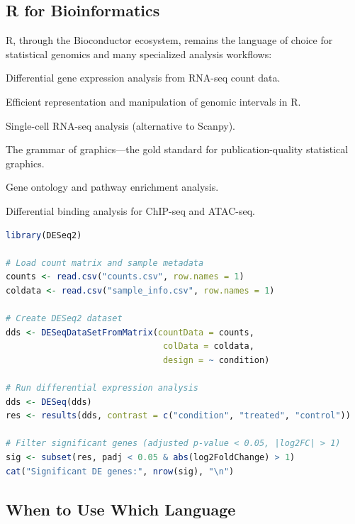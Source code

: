 \subsection{R for Bioinformatics}
\label{subsec:bioinf:r}

R, through the Bioconductor ecosystem, remains the language of choice for statistical genomics and many specialized analysis workflows:

\begin{description}[style=nextline, font=\bfseries, itemsep=3pt]
  \item[DESeq2 / edgeR / limma-voom] Differential gene expression analysis from RNA-seq count data.
  \item[GenomicRanges / GenomicAlignments] Efficient representation and manipulation of genomic intervals in R.
  \item[Seurat] Single-cell RNA-seq analysis (alternative to Scanpy).
  \item[ggplot2] The grammar of graphics---the gold standard for publication-quality statistical graphics.
  \item[clusterProfiler] Gene ontology and pathway enrichment analysis.
  \item[DiffBind] Differential binding analysis for ChIP-seq and ATAC-seq.
\end{description}

\begin{lstlisting}[language=R,caption={R example: basic DESeq2 differential expression analysis.},label=lst:deseq2-example]
library(DESeq2)

# Load count matrix and sample metadata
counts <- read.csv("counts.csv", row.names = 1)
coldata <- read.csv("sample_info.csv", row.names = 1)

# Create DESeq2 dataset
dds <- DESeqDataSetFromMatrix(countData = counts,
                               colData = coldata,
                               design = ~ condition)

# Run differential expression analysis
dds <- DESeq(dds)
res <- results(dds, contrast = c("condition", "treated", "control"))

# Filter significant genes (adjusted p-value < 0.05, |log2FC| > 1)
sig <- subset(res, padj < 0.05 & abs(log2FoldChange) > 1)
cat("Significant DE genes:", nrow(sig), "\n")
\end{lstlisting}

\subsection{When to Use Which Language}
\label{subsec:bioinf:whichlang}

